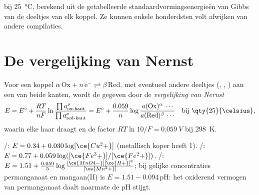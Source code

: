 \begin{omfigure}
\smallskip
{\small {} bij \qty{25}{\celsius}, berekend uit de
getabelleerde standaardvormingsenergieën van Gibbs van de deeltjes van
elk koppel. Ze kunnen enkele honderdsten volt afwijken van andere
compilaties.}
\end{omfigure}


\section{De vergelijking van Nernst}

\begin{theorem}\label{thm:b1:nernst:nernst}
Voor een koppel $\alpha\,\mathrm{Ox} + n\,\mathrm{e^-} \rightleftharpoons
\beta\,\mathrm{Red}$, met eventueel andere deeltjes (, ,
) aan een van beide kanten, wordt de  gegeven
door de \emph{vergelijking van Nernst}
\[
  E = E^\circ + \frac{RT}{nF}\ln\frac{\prod a_{\text{ox-kant}}^{\nu}}{\prod
  a_{\text{red-kant}}^{\nu}}
  = E^\circ + \frac{0.059}{n}\log\frac{a(\mathrm{Ox})^\alpha\,\cdots}{a(\mathrm{Red})^\beta\,\cdots}
  \quad\text{bij \qty{25}{\celsius}},
\]
waarin elke  haar  draagt en de factor
$RT\ln 10/F = \qty{0.059}{V}$ bij \qty{298}{K}.
\end{theorem}


\begin{example}\label{ex:b1:nernst:examples}
/: $E = 0.34 + 0.030\log[\ce{Cu^2+}]$ (metallisch koper
heeft  1).
/: $E = 0.77 + 0.059\log([\ce{Fe^3+}]/[\ce{Fe^2+}])$.
/: $E = 1.51 + \frac{0.059}{5}\log
\frac{[\ce{MnO4-}][\ce{H+}]^8}{[\ce{Mn^2+}]}$; bij gelijke concentraties
permanganaat en mangaan(II) is $E = 1.51 - 0.094\,\mathrm{pH}$: het
oxiderend vermogen van permanganaat daalt naarmate de pH stijgt.
\end{example}

